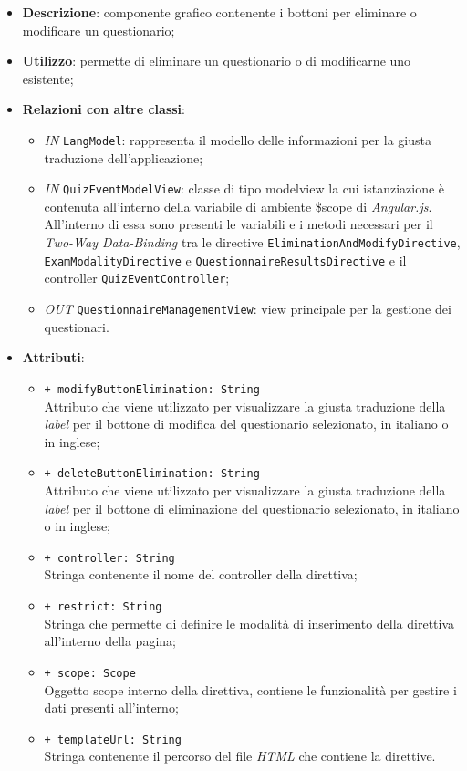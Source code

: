 \begin{itemize}
	\item \textbf{Descrizione}: componente grafico contenente i bottoni per eliminare o modificare un questionario;
	\item \textbf{Utilizzo}: permette di eliminare un questionario o di modificarne uno esistente;
	\item \textbf{Relazioni con altre classi}:
	\begin{itemize}
		\item \textit{IN} \texttt{LangModel}: rappresenta il modello delle informazioni per la giusta traduzione dell'applicazione;
		\item \textit{IN} \texttt{QuizEventModelView}: classe di tipo modelview la cui istanziazione è contenuta all'interno della variabile di ambiente \$scope di \textit{Angular.js}. All'interno di essa sono presenti le variabili e i metodi necessari per il \textit{Two-Way Data-Binding} tra le directive \texttt{EliminationAndModifyDirective}, \texttt{ExamModalityDirective} e \texttt{QuestionnaireResultsDirective} e il controller \texttt{QuizEventController};
		\item \textit{OUT} \texttt{QuestionnaireManagementView}: view principale per la gestione dei questionari.
	\end{itemize}
	\item \textbf{Attributi}:
	\begin{itemize}
		\item \texttt{+ modifyButtonElimination: String} \\ Attributo che viene utilizzato per visualizzare la giusta traduzione della \textit{label} per il bottone di modifica del questionario selezionato, in italiano o in inglese; 
		\item \texttt{+ deleteButtonElimination: String} \\ Attributo che viene utilizzato per visualizzare la giusta traduzione della \textit{label} per il bottone di eliminazione del questionario selezionato, in italiano o in inglese;
		\item \texttt{+ controller: String} \\ Stringa contenente il nome del controller della direttiva;
		\item \texttt{+ restrict: String} \\ Stringa che permette di definire le modalità di inserimento della direttiva all'interno della pagina;
		\item \texttt{+ scope: Scope} \\ Oggetto scope interno della direttiva, contiene le funzionalità per gestire i dati presenti all'interno;
		\item \texttt{+ templateUrl: String} \\ Stringa contenente il percorso del file \textit{HTML} che contiene la direttive.
	\end{itemize}
\end{itemize}
